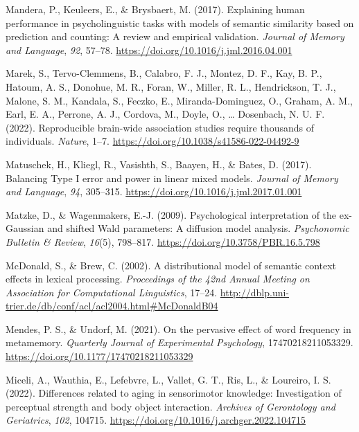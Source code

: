 \documentclass[
  12pt,
  man,floatsintext]{apa7}
\newlength{\cslhangindent}
\newlength{\cslentryspacingunit} %
\newenvironment{CSLReferences}[2] %
 {%
  \setlength{\parindent}{0pt}
  \ifodd #1
  \let\oldpar\par
  \def\par{\hangindent=\cslhangindent\oldpar}
  \fi
  \setlength{\parskip}{#2\cslentryspacingunit}
 }%
 {}
\begin{document}
\begin{CSLReferences}{1}{0}
\leavevmode{}%
Mandera, P., Keuleers, E., \& Brysbaert, M. (2017). Explaining human performance in psycholinguistic tasks with models of semantic similarity based on prediction and counting: {A} review and empirical validation. \emph{Journal of Memory and Language}, \emph{92}, 57--78. \url{https://doi.org/10.1016/j.jml.2016.04.001}

\leavevmode{}%
Marek, S., Tervo-Clemmens, B., Calabro, F. J., Montez, D. F., Kay, B. P., Hatoum, A. S., Donohue, M. R., Foran, W., Miller, R. L., Hendrickson, T. J., Malone, S. M., Kandala, S., Feczko, E., Miranda-Dominguez, O., Graham, A. M., Earl, E. A., Perrone, A. J., Cordova, M., Doyle, O., \ldots{} Dosenbach, N. U. F. (2022). Reproducible brain-wide association studies require thousands of individuals. \emph{Nature}, 1--7. \url{https://doi.org/10.1038/s41586-022-04492-9}

\leavevmode{}%
Matuschek, H., Kliegl, R., Vasishth, S., Baayen, H., \& Bates, D. (2017). Balancing {Type I} error and power in linear mixed models. \emph{Journal of Memory and Language}, \emph{94}, 305--315. \url{https://doi.org/10.1016/j.jml.2017.01.001}

\leavevmode{}%
Matzke, D., \& Wagenmakers, E.-J. (2009). Psychological interpretation of the ex-{Gaussian} and shifted {Wald} parameters: {A} diffusion model analysis. \emph{Psychonomic Bulletin \& Review}, \emph{16}(5), 798--817. \url{https://doi.org/10.3758/PBR.16.5.798}

\leavevmode{}%
McDonald, S., \& Brew, C. (2002). A distributional model of semantic context effects in lexical processing. \emph{Proceedings of the 42nd Annual Meeting on Association for Computational Linguistics}, 17--24. \url{http://dblp.uni-trier.de/db/conf/acl/acl2004.html\#McDonaldB04}

\leavevmode{}%
Mendes, P. S., \& Undorf, M. (2021). On the pervasive effect of word frequency in metamemory. \emph{Quarterly Journal of Experimental Psychology}, 17470218211053329. \url{https://doi.org/10.1177/17470218211053329}

\leavevmode{}%
Miceli, A., Wauthia, E., Lefebvre, L., Vallet, G. T., Ris, L., \& Loureiro, I. S. (2022). Differences related to aging in sensorimotor knowledge: {Investigation} of perceptual strength and body object interaction. \emph{Archives of Gerontology and Geriatrics}, \emph{102}, 104715. \url{https://doi.org/10.1016/j.archger.2022.104715}


\end{CSLReferences}
\end{document}
